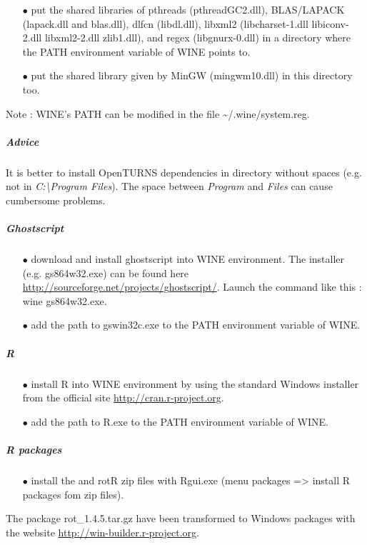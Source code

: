 \begin{itemize}
\item[$\bullet$]  put the shared libraries of pthreads (pthreadGC2.dll), BLAS/LAPACK (lapack.dll and blas.dll), dlfcn (libdl.dll), libxml2 (libcharset-1.dll libiconv-2.dll libxml2-2.dll zlib1.dll), and regex (libgnurx-0.dll) in a directory where the PATH environment variable of WINE points to.
\item[$\bullet$]  put the shared library given by MinGW (mingwm10.dll) in this directory too.
\end{itemize}

Note : WINE's PATH can be modified in the file \textasciitilde{}/.wine/system.reg.


\subparagraph{Advice}

It is better to install OpenTURNS dependencies in directory without spaces (e.g. not in \emph{C:\textbackslash Program Files}).
The space between \emph{Program} and \emph{Files} can cause cumbersome problems.

\subparagraph{Ghostscript}
\begin{itemize}
\item[$\bullet$]  download and install ghostscript into WINE environment. The installer (e.g. gs864w32.exe) can be found here \url{http://sourceforge.net/projects/ghostscript/}. Launch the command like this : wine gs864w32.exe.
\item[$\bullet$]  add the path to gswin32c.exe to the PATH environment variable of WINE.
\end{itemize}

\subparagraph{R}
\begin{itemize}
\item[$\bullet$]  install R into WINE environment by using the standard Windows installer from the official site \url{http://cran.r-project.org}.
\item[$\bullet$]  add the path to R.exe to the PATH environment variable of WINE.
\end{itemize}

\subparagraph{R packages}

\begin{itemize}
\item[$\bullet$]  install the and rotR zip files with Rgui.exe  (menu packages => install R packages fom zip files).
\end{itemize}

The package rot\_1.4.5.tar.gz have been transformed to Windows packages with the website \url{http://win-builder.r-project.org}.

